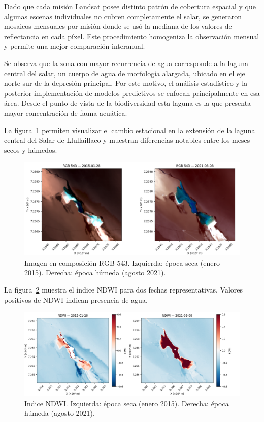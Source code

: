 Dado que cada misión Landsat posee distinto patrón de cobertura espacial y que algunas escenas individuales no cubren completamente el salar, se generaron mosaicos mensuales por misión donde se usó la mediana de los valores de reflectancia en cada píxel. Este procedimiento homogeniza la observación mensual y permite una mejor comparación interanual.


Se observa que la zona con mayor recurrencia de agua corresponde a la laguna central del salar, un cuerpo de agua de morfología alargada, ubicado en el eje norte-sur de la depresión principal. Por este motivo, el análisis estadístico y la posterior implementación de modelos predictivos se enfocan principalmente en esa área. Desde el punto de vista de la biodiversidad esta laguna es la que presenta mayor concentración de fauna acuática.

La figura~\ref{fig:epoca_seca_hum}  permiten visualizar el cambio estacional en la extensión de la laguna central del Salar de Llullaillaco y muestran diferencias notables entre los meses secos y húmedos.


\begin{figure}[ht]
        \centering
        \includegraphics[scale=.37]
        {Figures/rbg_cap3_a.png}
        \caption{Imagen en composición RGB 543. Izquierda: época seca (enero 2015). Derecha: época húmeda (agosto 2021).}
        \label{fig:epoca_seca_hum}
\end{figure}


La figura~\ref{fig:ndwi_seco_hum} muestra el índice NDWI para dos fechas representativas. Valores positivos de NDWI indican presencia de agua.


\begin{figure}[ht]
        \centering
        \includegraphics[scale=.37]
        {Figures/rgb_cap3_b.png}
        \caption{Indice NDWI. Izquierda: época seca (enero 2015). Derecha: época húmeda (agosto 2021).}
        \label{fig:ndwi_seco_hum}
\end{figure}



